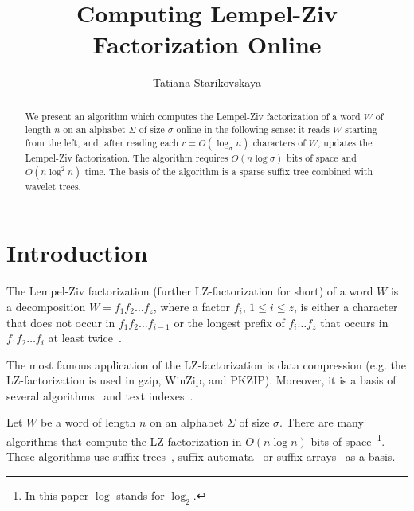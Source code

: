 \documentclass[10pt]{llncs}
\begin{document}
\title{Computing Lempel-Ziv Factorization Online}


\author
{
   Tatiana Starikovskaya
}
\date{\empty}
\maketitle

\begin{abstract}
We present an algorithm which computes the Lempel-Ziv factorization of a word $W$ of length $n$ on an alphabet $\Sigma$ of size $\sigma$ online in the following sense: it reads $W$ starting from the left, and, after reading each $r = O(\log_{\sigma}{n})$ characters of $W$, updates the Lempel-Ziv factorization. The algorithm requires $O(n\log\sigma)$ bits of space and $O(n \log^2{n})$ time. The basis of the algorithm is a sparse suffix tree combined with wavelet trees.
\end{abstract}

\section{Introduction}
The Lempel-Ziv factorization (further LZ-factorization for short) of a word $W$ is a decomposition $W = f_1 f_2 \ldots f_z$, where a factor $f_i$, $1 \leq i \leq z$, is either a character that does not occur in $f_1 f_2 \ldots f_{i-1}$ or the longest prefix of $f_i\ldots f_z$ that occurs in $f_1f_2 \ldots f_i$ at least twice~\cite{Crochemore:1986:TR:21537.21539,Ziv77auniversal}.

The most famous application of the LZ-factorization is data compression (e.g. the LZ-factorization is used in gzip, WinZip, and PKZIP). Moreover, it is a basis of several algorithms~\cite{Kolpakov99findingmaximal,Gusfield:2004:LTA:1046081.1046083} and text indexes~\cite{Kreft:2011:SBL:2018243.2018251}.

Let $W$ be a word of length $n$ on an alphabet $\Sigma$ of size $\sigma$. There are many algorithms that compute the LZ-factorization in $O(n \log{n})$ bits of space~\footnote{In this paper $\log$ stands for $\log_2$.}. These algorithms use suffix trees~\cite{Rodeh:1981:LAD:322234.322237}, suffix automata~\cite{Crochemore:1986:TR:21537.21539} or suffix arrays~\cite{Abouelhoda:2004:RST:985384.985389,journals/mics/ChenPS08,Crochemore:2008:CLP:1346353.1346507,conf/iwoca/CrochemoreIIKRW09,Crochemore:2008:SAC:1395764.1395899,Ohlebusch:2011:LFR:2018243.2018249} as a basis.
\end{document}
